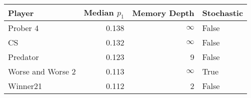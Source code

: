 \begin{tabular}{lrrl}
\toprule
            Player &  Median $p_1$ &  Memory Depth & Stochastic \\
\midrule
          Prober 4 &         0.138 &            \(\infty\) &      False \\
                CS &         0.132 &            \(\infty\) &      False \\
          Predator &         0.123 &             9 &      False \\
 Worse and Worse 2 &         0.113 &            \(\infty\) &       True \\
          Winner21 &         0.112 &             2 &      False \\
\bottomrule
\end{tabular}
